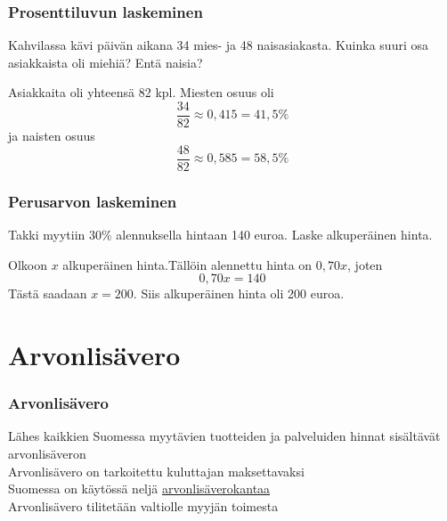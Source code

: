 \documentclass{beamer}
\newcommand{\pblock}{\\ \vspace{0.5cm}\pause}
\begin{document}
\begin{frame}
\frametitle{Prosenttiluvun laskeminen}
	\pause 
	\begin{esim}
		Kahvilassa kävi päivän aikana 34 mies- ja 48 naisasiakasta. Kuinka suuri osa asiakkaista oli miehiä? Entä naisia?
	\end{esim}
	\pause
	\begin{ratkaisu}
		Asiakkaita oli yhteensä 82 kpl. \pause Miesten osuus oli
		\[
			\frac{34}{82} \approx 0,415 = 41,5\%
		\]
		\pause
		ja naisten osuus
		\[
			\frac{48}{82} \approx 0,585 = 58,5 \%
		\]
		
	\end{ratkaisu}
\end{frame}

\begin{frame}
\frametitle{Perusarvon laskeminen}
	\begin{esim}
		Takki myytiin 30\% alennuksella hintaan 140 euroa. Laske alkuperäinen hinta.
	\end{esim}
	\begin{ratkaisu}
		Olkoon \(x\) alkuperäinen hinta.\pause Tällöin alennettu hinta on \(0,70x\)\pause , joten
		\[
			0,70x = 140
		\]
		\pause Tästä saadaan \(x=200\). \pause Siis alkuperäinen hinta oli 200 euroa.
	\end{ratkaisu}
\end{frame}

%

\section{Arvonlisävero}

\begin{frame}
\frametitle{Arvonlisävero}
\pause
Lähes kaikkien Suomessa myytävien tuotteiden ja palveluiden hinnat sisältävät arvonlisäveron
\pblock
Arvonlisävero on tarkoitettu kuluttajan maksettavaksi
\pblock
Suomessa on käytössä neljä \href{http://www.veronmaksajat.fi/luvut/tilastot/kulutusverot/arvonlisavero/}{arvonlisäverokantaa}
\pblock
Arvonlisävero tilitetään valtiolle myyjän toimesta
\end{frame}
\end{document}

